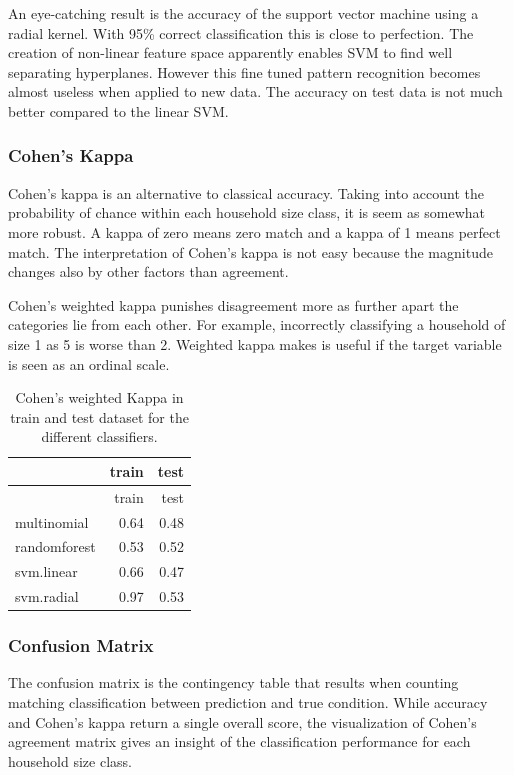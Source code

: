 \documentclass[]{article}
\begin{document}
An eye-catching result is the accuracy of the support vector machine
using a radial kernel. With 95\% correct classification this is close to
perfection. The creation of non-linear feature space apparently enables
SVM to find well separating hyperplanes. However this fine tuned pattern
recognition becomes almost useless when applied to new data. The
accuracy on test data is not much better compared to the linear SVM.

\hypertarget{cohens-kappa}{%
\subsubsection{Cohen's Kappa}\label{cohens-kappa}}

Cohen's kappa is an alternative to classical accuracy. Taking into
account the probability of chance within each household size class, it
is seem as somewhat more robust. A kappa of zero means zero match and a
kappa of 1 means perfect match. The interpretation of Cohen's kappa is
not easy because the magnitude changes also by other factors than
agreement.

Cohen's weighted kappa punishes disagreement more as further apart the
categories lie from each other. For example, incorrectly classifying a
household of size 1 as 5 is worse than 2. Weighted kappa makes is useful
if the target variable is seen as an ordinal scale.

\begin{longtable}[]{@{}lrr@{}}
\caption{\label{tab:tab8} Cohen's weighted Kappa in train and test
dataset for the different classifiers.}\tabularnewline
\toprule
& train & test\tabularnewline
\midrule
\endfirsthead
\toprule
& train & test\tabularnewline
\midrule
\endhead
multinomial & 0.64 & 0.48\tabularnewline
randomforest & 0.53 & 0.52\tabularnewline
svm.linear & 0.66 & 0.47\tabularnewline
svm.radial & 0.97 & 0.53\tabularnewline
\bottomrule
\end{longtable}

\hypertarget{confusion-matrix}{%
\subsubsection{Confusion Matrix}\label{confusion-matrix}}

The confusion matrix is the contingency table that results when counting
matching classification between prediction and true condition. While
accuracy and Cohen's kappa return a single overall score, the
visualization of Cohen's agreement matrix gives an insight of the
classification performance for each household size class.
\end{document}
